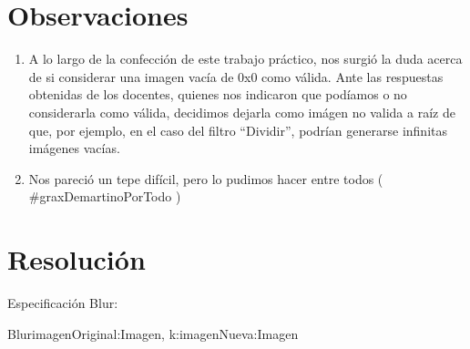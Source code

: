 \documentclass[10pt,a4paper,spanish]{article}
\begin{document}


\maketitle

\newpage


\clearpage

% 

\section{Observaciones}

	\begin{enumerate}
		\item A lo largo de la confección de este trabajo práctico, nos surgió la duda acerca de si considerar una imagen vacía de 0x0 como válida. Ante las respuestas obtenidas de los docentes, quienes nos indicaron que podíamos o no considerarla como válida, decidimos dejarla como imágen no valida a raíz de que, por ejemplo, en el caso del filtro ``Dividir'', podrían generarse infinitas imágenes vacías.
		\item Nos pareció un tepe difícil, pero lo pudimos hacer entre todos ( \#graxDemartinoPorTodo )
	\end{enumerate}


\section{Resolución}

\begin{ejercicio}
	Especificación Blur:

	\begin{problema}{Blur}{imagenOriginal:Imagen, k:\ent}{imagenNueva:Imagen}
		\asegura{todos([imagenNueva[y][x] == colorPromedioEnPosicion(imagenOriginal,x,y,k) \linebreak | \  x \leftarrow [0..ancho(im)),y \leftarrow [0..alto(im))])}
	\end{problema}

\end{ejercicio}
\end{document}

